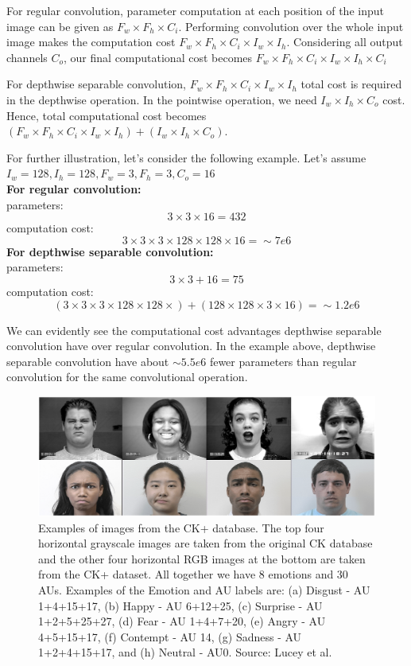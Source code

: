 \documentclass[master]{thesis-uestc}
\begin{document}
For regular convolution, parameter computation at each position of the input image can be given as $F_w \times F_h \times C_i$. Performing convolution over the whole input image makes the computation cost $F_w \times F_h \times C_i \times I_w \times I_h$. Considering all output channels $C_o$, our final computational cost becomes $F_w \times F_h \times C_i \times I_w \times I_h \times C_i$

For depthwise separable convolution, $F_w \times F_h \times C_i \times I_w \times I_h$ total cost is required in the depthwise operation. In the pointwise operation, we need $I_w \times I_h \times C_o$ cost. Hence, total computational cost becomes $(F_w \times F_h \times C_i \times I_w \times I_h) + (I_w \times I_h \times C_o)$.

For further illustration, let's consider the following example. Let's assume $I_w = 128, I_h = 128, F_w = 3, F_h = 3, C_o = 16$ \\
\textbf{For regular convolution:} \\
parameters:
\[3 \times 3 \times 16 = 432\]
computation cost:
\[3 \times 3 \times 3 \times 128 \times 128 \times 16 = \sim7e6\]
\textbf{For depthwise separable convolution:}\\
parameters:
\[3 \times 3 + 16 = 75 \]
computation cost:
\[(3 \times 3 \times 3 \times 128 \times 128 \times) + (128 \times 128 \times 3 \times 16) = \sim1.2e6 \]

We can evidently see the computational cost advantages depthwise separable convolution have over regular convolution. In the example above, depthwise separable convolution have about $\sim5.5e6$ fewer parameters than regular convolution for the same convolutional operation.

\begin{figure}[ht]
\includegraphics[width=5in]{pic/ck+.PNG}
\caption{Examples of images from the CK+ database. The top four horizontal grayscale images are taken from the original CK database and the other four horizontal RGB images at the bottom are taken from the CK+ dataset. All together we have 8 emotions and 30 AUs. Examples of the Emotion and AU labels
are: (a) Disgust - AU 1+4+15+17, (b) Happy - AU 6+12+25, (c) Surprise - AU 1+2+5+25+27, (d) Fear - AU 1+4+7+20, (e) Angry - AU 4+5+15+17, (f) Contempt - AU 14, (g) Sadness - AU 1+2+4+15+17, and (h) Neutral - AU0. Source: Lucey et al.\cite{5543262}}
\label{CK+_images}
\end{figure}
\end{document}
